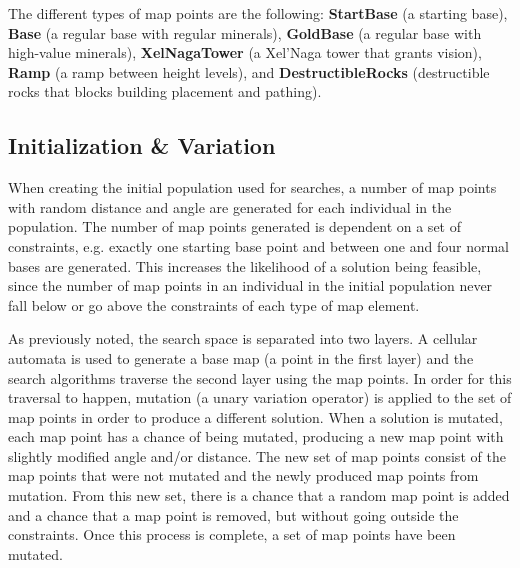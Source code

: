 The different types of map points are the following: \textbf{StartBase} (a starting base), \textbf{Base} (a regular base with regular minerals), \textbf{GoldBase} (a regular base with high-value minerals), \textbf{XelNagaTower} (a Xel'Naga tower that grants vision), \textbf{Ramp} (a ramp between height levels), and \textbf{DestructibleRocks} (destructible rocks that blocks building placement and pathing).

\subsection{Initialization \& Variation}
\label{methodology_genotype_initialization}
When creating the initial population used for searches, a number of map points with random distance and angle are generated for each individual in the population. The number of map points generated is dependent on a set of constraints, e.g. exactly one starting base point and between one and four normal bases are generated. This increases the likelihood of a solution being feasible, since the number of map points in an individual in the initial population never fall below or go above the constraints of each type of map element.

As previously noted, the search space is separated into two layers. A cellular automata is used to generate a base map (a point in the first layer) and the search algorithms traverse the second layer using the map points. In order for this traversal to happen, mutation (a unary variation operator) is applied to the set of map points in order to produce a different solution. When a solution is mutated, each map point has a chance of being mutated, producing a new map point with slightly modified angle and/or distance. The new set of map points consist of the map points that were not mutated and the newly produced map points from mutation. From this new set, there is a chance that a random map point is added and a chance that a map point is removed, but without going outside the constraints. Once this process is complete, a set of map points have been mutated.